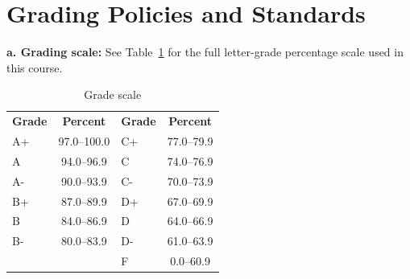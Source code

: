 \documentclass[12pt]{article}
\newcommand\tagpdfsetup[1]{}
\begin{document}
\section*{Grading Policies and Standards}

\noindent \textbf{a. Grading scale:}
\noindent See Table~\ref{tab:grading-scale} for the full letter-grade percentage scale used in this course.
\begin{center}
\begin{table}[h]
    \caption{Grade scale}
    \label{tab:grading-scale}
    \centering
    \tagpdfsetup{table/header-rows={1}}
    \begin{tabular}{l c l c}
    \rowcolor{gray!20}
    \textbf{Grade} & \textbf{Percent} & \textbf{Grade} & \textbf{Percent} \\
    A+    & 97.0--100.0 & C+ & 77.0--79.9 \\
    A     & 94.0--96.9  & C  & 74.0--76.9 \\
    A-    & 90.0--93.9  & C- & 70.0--73.9 \\
    B+    & 87.0--89.9  & D+ & 67.0--69.9 \\
    B     & 84.0--86.9  & D  & 64.0--66.9 \\
    B-    & 80.0--83.9  & D- & 61.0--63.9 \\
          &             & F  & 0.0--60.9 \\
    \end{tabular}
\end{table}
\end{center}
\end{document}
